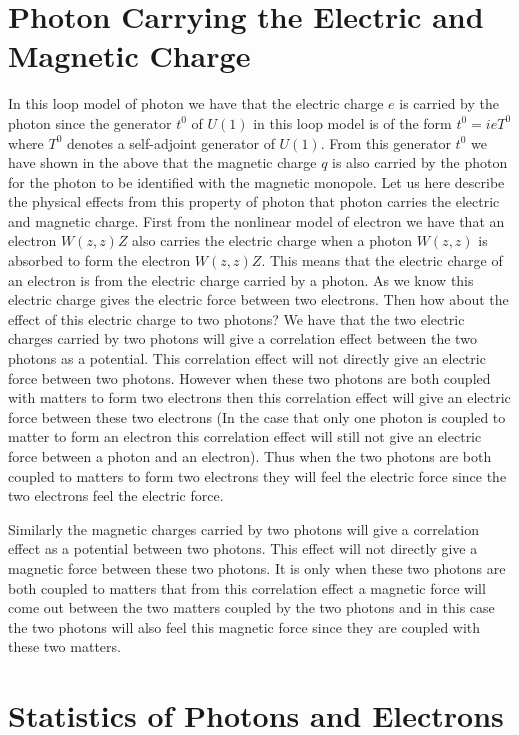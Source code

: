 \documentclass[a4paper,a4paper]{article}
\begin{document}
\section{Photon Carrying the Electric and Magnetic Charge}

In this loop model of photon we have that the electric charge $e$ is carried by the photon since the generator $t^0$ of $U(1)$ in this loop model is of the form $t^0=ieT^0$ where $T^0$ denotes a self-adjoint generator of $U(1)$. From this generator $t^0$ we have shown in the above that the magnetic charge $q$ is also carried by the photon for the photon to be identified with the magnetic monopole. Let us here describe the physical effects from this property of photon that photon carries the electric and magnetic charge. First from the nonlinear model of electron we have that an electron $W(z,z)Z$ also carries the electric charge when a photon $W(z,z)$ is absorbed to form the electron $W(z,z)Z$. This means that the electric charge of an electron is from the electric charge carried by a photon. As we know this electric charge gives the electric force between two electrons. Then how about the effect of this electric charge to two photons? We have that the two electric charges carried by two photons will give a correlation effect between the two photons as a potential. This correlation effect will not directly give an electric force between two photons. However when these two photons are both coupled with matters to form two electrons then this  correlation effect will give an electric force between these two electrons (In the case that only one photon is coupled to matter to form an electron this correlation effect will still not give an electric force between a photon and an electron). Thus when the two photons are both coupled to matters to form two electrons they will feel the electric force since the two electrons feel the electric force.

Similarly the magnetic charges carried by two photons will give a correlation effect as a potential between two photons. This effect will not directly give a magnetic force between these two photons. It is only when these two photons are both coupled to matters that from this correlation effect a magnetic force will come out between the two matters coupled by the two photons and in this case the two photons will also feel this magnetic force since they are coupled with these two matters.

\section{Statistics of Photons and Electrons}
\end{document}
